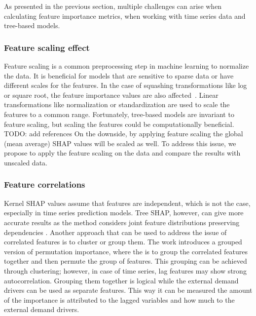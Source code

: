 

As presented in the previous section, multiple challenges can arise when calculating feature importance metrics, when working with time series data and tree-based models.

\subsubsection{Feature scaling effect}
Feature scaling is a common preprocessing step in machine learning to normalize the data.
It is beneficial for models that are sensitive to sparse data or have different scales for the features.
In the case of squashing transformations like log or square root, the feature importance values are also affected~\cite{shapDocumentation}.
Linear transformations like normalization or standardization are used to scale the features to a common range.
Fortunately, tree-based models are invariant to feature scaling, but scaling the features could be computationally beneficial. \color{red}TODO: add references \color{black}
On the downside, by applying feature scaling the global (mean average) SHAP values will be scaled as well.
To address this issue, we propose to apply the feature scaling on the data and compare the results with unscaled data.

\subsubsection{Feature correlations}
Kernel SHAP values assume that features are independent, which is not the case, especially in time series prediction models.
Tree SHAP, however, can give more accurate results as the method considers joint feature distributions preserving dependencies \cite{Molnar2022}.
Another approach that can be used to address the issue of correlated features is to cluster or group them.
The work \cite{Plagwitz2022} introduces a grouped version of permutation importance, where the is to group the correlated features together and then permute the group of features.
This grouping can be achieved through clustering; however, in case of time series, lag features may show strong autocorrelation.
Grouping them together is logical while the external demand drivers can be used as separate features.
This way it can be measured the amount of the importance is attributed to the lagged variables and how much to the external demand drivers.

